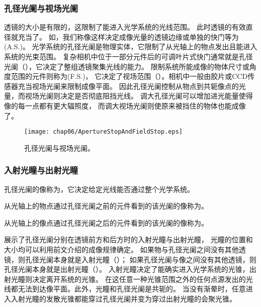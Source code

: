 \subsubsection{孔径光阑与视场光阑}
透镜的大小是有限的，这限制了能进入光学系统的光线范围。
此时透镜的有效直径就充当了。
如，我们称像这样决定成像光量的透镜边缘或单独的快门等为(A.S.)。
光学系统的孔径光阑是物理实体，它限制了从光轴上的物点发出且能进入系统的光束范围。
复杂相机中位于一部分元件后的可调叶片式快门通常就是孔径光阑（），它决定了整组透镜聚集光线的能力。
限制系统所能成像的物体尺寸或角度范围的元件则称为(F.S.)，
它决定了视场范围（）。相机中一般由胶片或CCD传感器充当视场光阑来限制成像平面。
因此孔径光阑控制从物点到共轭像点的光量，而视场光阑则决定是否彻底阻挡光线。
调大孔径光阑可以增加进光能量使得像的每一点都有更大辐照度，
而调大视场光阑则使原来被挡住的物体也能成像了。
\begin{figure}[htbp]
    \centering\texttt{[image: chap06/ApertureStopAndFieldStop.eps]}
    \caption{孔径光阑与视场光阑。}
    \label{fig:6.48}
\end{figure}

\subsubsection{入射光瞳与出射光瞳}
孔径光阑的像称为，它决定给定光线能否通过整个光学系统。
\begin{definition}
    从光轴上的物点通过孔径光阑之前的元件看到的该光阑的像称为。
\end{definition}
\begin{definition}
    从光轴上的像点通过孔径光阑之后的元件看到的该光阑的像称为。
\end{definition}

展示了孔径光阑分别在透镜前方和后方时的入射光瞳与出射光瞳，
光瞳的位置和大小均可以利用前文介绍的成像规律确定。
如果物与孔径光阑之间没有其他透镜，则孔径光阑本身就是入射光瞳（）；
如果孔径光阑与像之间没有其他透镜，则孔径光阑本身就是出射光瞳（）。
入射光瞳决定了能确实进入光学系统的光锥，出射光瞳则决定离开系统的光锥。
在这任意一种光锥范围之外的任何点源发出的光线都无法到达像平面。此外，光瞳和孔径光阑是共轭的。
当没有渐晕时，任意进入入射光瞳的发散光锥都能穿过孔径光阑并变为穿过出射光瞳的会聚光锥。

